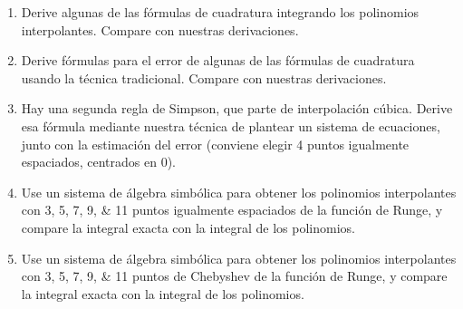 \begin{enumerate}
\item
  Derive algunas de las fórmulas de cuadratura
  integrando los polinomios interpolantes.
  Compare con nuestras derivaciones.
\item
  Derive fórmulas para el error de algunas de las fórmulas de cuadratura
  usando la técnica tradicional.
  Compare con nuestras derivaciones.
\item
  Hay una segunda regla de Simpson,
  que parte de interpolación cúbica.
  Derive esa fórmula mediante nuestra técnica
  de plantear un sistema de ecuaciones,
  junto con la estimación del error
  (conviene elegir \num{4} puntos igualmente espaciados,
   centrados en \num{0}).
\item
  Use un sistema de álgebra simbólica
  para obtener los polinomios interpolantes con
  \numlist{3; 5; 7; 9; 11}  puntos igualmente espaciados
  de la función de Runge,
  y compare la integral exacta con la integral de los polinomios.
\item
  Use un sistema de álgebra simbólica
  para obtener los polinomios interpolantes
  con \numlist{3; 5; 7; 9; 11} puntos de Chebyshev
  de la función de Runge,
  y compare la integral exacta con la integral de los polinomios.
\end{enumerate}





